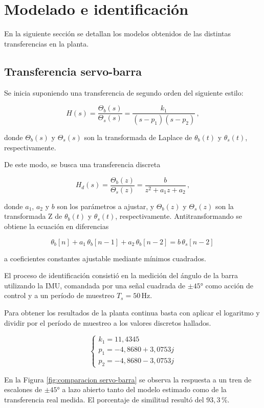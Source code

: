 \documentclass[a4paper,12pt]{article}
\begin{document}
\section{Modelado e identificación}

En la siguiente sección se detallan los modelos obtenidos de las distintas transferencias en la planta. 

\subsection{Transferencia servo-barra}

Se inicia suponiendo una transferencia de segundo orden del siguiente estilo:

\[
H(s) = \frac{\Theta_b (s)}{\Theta_s (s)} = \frac{k_1}{(s - p_1)(s - p_2)}\,, 
\]

donde $\Theta_b(s)$ y $\Theta_s(s)$ son la transformada de Laplace de $\theta_b(t)$ y $\theta_s(t)$, respectivamente.

De este modo, se busca una transferencia discreta

\[
H_d (s) = \frac{\Theta_b (z)}{\Theta_s (z)} = \frac{b}{z^2 + a_1 z + a_2}\,,  
\]

donde $a_1$, $a_2$ y $b$ son los parámetros a ajustar, y $\Theta_b(z)$ y $\Theta_s(z)$ son la transformada Z de $\theta_b(t)$ y $\theta_s(t)$, respectivamente. Antitransformando se obtiene la ecuación en diferencias

\[
\theta_b[n] + a_1\,\theta_b[n-1] + a_2\,\theta_b[n-2] = b\,\theta_s[n-2]\,
\]

a coeficientes constantes ajustable mediante mínimos cuadrados.

El proceso de identificación consistió en la medición del ángulo de la barra utilizando la IMU, comandada por una señal cuadrada de $\pm 45$° como acción de control y a un período de muestreo $T_s = 50\,$Hz. 

Para obtener los resultados de la planta continua basta con aplicar el logaritmo y dividir por el período de muestreo a los valores discretos hallados. 

\[
\begin{cases}
k_1 = 11,4345 \\
p_1 = -4,8680 + 3,0753j \\
p_2 = -4,8680 - 3,0753j
\end{cases}
\]

En la Figura \ref{fig:comparacion servo-barra} se observa la respuesta a un tren de escalones de $\pm45$° a lazo abierto tanto del modelo estimado como de la transferencia real medida. El porcentaje de similitud resultó del $93,3\,$\%.
\end{document}
